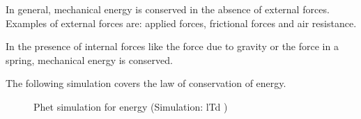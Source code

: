         \label{m38786*id68640}In general, mechanical energy is conserved in the absence of external forces. Examples of external forces are: applied forces, frictional forces and air resistance.\par 
        \label{m38786*id68645}In the presence of internal forces like the force due to gravity or the force in a spring, mechanical energy is conserved.\par \label{m38786*eip-385}The following simulation covers the law of conservation of energy. \newline
    \setcounter{subfigure}{0}
	\begin{figure}[H] %
    \textnormal{Phet simulation for energy}\vspace{.1in} \nopagebreak
  \label{m38806*phet!!!underscore!!!sim}\label{m38806*phet-simulation}
             { (Simulation:  lTd )}
      \vspace{2pt}
    \vspace{.1in}
 \end{figure}       \par 
      \label{m38786*uid79}

